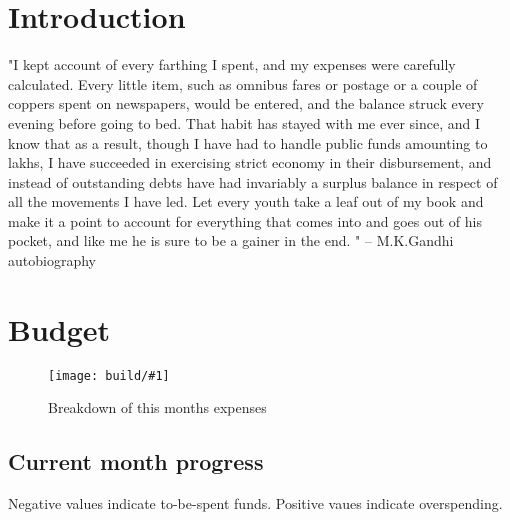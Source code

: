 \documentclass[pdftex,12pt,letterpaper]{report}
\newcommand{\insertplot}[1]{\texttt{[image: build/\#1]}\\[1cm]}
\begin{document}


\tableofcontents

\chapter*{Introduction}

"I kept account of every farthing I spent, and my expenses were carefully calculated. 
Every little item, such as omnibus fares or postage or a couple of coppers spent on newspapers, would be entered, and the balance struck every evening before going to bed.
That habit has stayed with me ever since, and I know that as a result, though I have had to handle public funds amounting to lakhs, I have succeeded in exercising strict economy in their disbursement, and instead of outstanding debts have had invariably a surplus balance in respect of all the movements I have led.
Let every youth take a leaf out of my book and make it a point to account for everything that comes into and goes out of his pocket, and like me he is sure to be a gainer in the end.
" -- M.K.Gandhi autobiography


\chapter{Budget}

\begin{figure}
\caption{Breakdown of this months expenses}

\insertplot{monthexpensepie}

\end{figure}

\section{Current month progress}

Negative values indicate to-be-spent funds.  Positive vaues indicate overspending.
\end{document}
